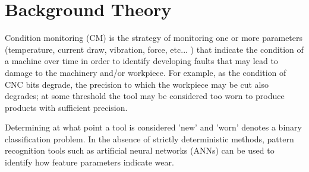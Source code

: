 \documentclass[../main.tex]{subfiles}
\begin{document}
\section{Background Theory}




Condition monitoring (CM) is the strategy of monitoring one or more parameters (temperature, current draw, vibration, force,  etc... \cite{citation(s)_needed}) that indicate the condition of a machine over time in order to identify developing faults that may lead to damage to the machinery and/or workpiece. For example, as the condition of CNC bits degrade, the precision to which the workpiece may be cut also degrades; at some threshold the tool may be considered too worn to produce products with sufficient precision.


Determining at what point a tool is considered 'new' and 'worn' denotes a binary classification problem. In the absence of strictly deterministic methods, pattern recognition tools such as artificial neural networks (ANNs) can be used to identify how feature parameters indicate wear.  




\biblio
\end{document}
